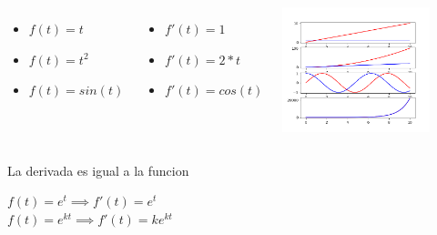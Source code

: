 \begin{frame}{2.7182818284590450907955982984276488423347473144}
   \begin{columns}[onlytextwidth]
      \begin{itemize}
         \item $f(t) =t$
         \item $f(t) =t^2$
         \item $f(t) =sin(t)$
      \end{itemize}
      \begin{itemize}
         \item $f'(t) = 1$
         \item $f'(t) = 2*t$
         \item $f'(t) = cos(t)$
      \end{itemize}
      \includegraphics[width=0.8\textwidth]{3_clase/derivadas}
   \end{columns}
   \begin{block}{La derivada es igual a la funcion}
      \begin{center}
         $f(t) =e^t    \implies f'(t) = e^t$\\
         $f(t) =e^{kt} \implies f'(t) =ke^{kt}$
      \end{center}
   \end{block}
   \vfill
\end{frame}
